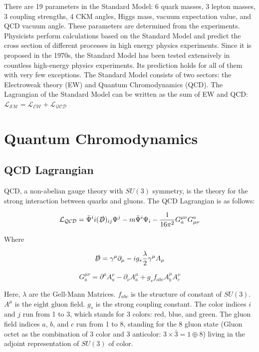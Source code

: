 There are 19 parameters in the Standard Model: 6 quark masses, 3 lepton masses, 3 coupling strengths, 4 CKM angles, Higgs mass, vacuum expectation value, and QCD vacuum angle. These parameters are determined from the experiments. Physicists perform calculations based on the Standard Model and predict the cross section of different processes in high energy physics experiments. Since it is proposed in the 1970s, the Standard Model has been tested extensively in countless high-energy physics experiments. Its prediction holds for all of them with very few exceptions. The Standard Model consists of two sectors: the Electroweak theory (EW) and Quantum Chromodynamics (QCD). The Lagrangian of the Standard Model can be written as the sum of EW and QCD: $\mathcal{L_{SM}} = \mathcal{L_{EW}} + \mathcal{L_{QCD}}$ 


\section{Quantum Chromodynamics}

\subsection{QCD Lagrangian}

QCD, a non-abelian gauge theory with $SU(3)$ symmetry, is the theory for the strong interaction between quarks and gluons. The QCD Lagrangian is as follows:


\begin{equation}
\mathcal{L_{QCD}} = \bar \Psi^i i (\slashed{D})_{ij} \Psi^j - m  \bar \Psi^i \Psi_i - \frac{1}{16\pi^2} G^{\mu\nu}_{a}G_{\mu\nu}^{a}
\end{equation}

Where 

\begin{equation}
\slashed{D} = \gamma^\mu \partial_\mu - i g_s \frac{\lambda}{2}  \gamma^\mu A_\mu
\end{equation}

\begin{equation}
G^{\mu\nu}_{a} = \partial^\mu A^\nu_{a} - \partial_{\nu} A^\mu_{a} + g_s f_{abc} A^\mu_b A^\nu_c 
\end{equation}

Here, $\lambda$ are the Gell-Mann Matrices. $f_{abc}$ is the structure of constant of $SU(3)$. $A^\mu$ is the eight gluon field. $g_s$ is the strong coupling constant. The color indices $i$ and $j$ run from 1 to 3, which stands for 3 colors: red, blue, and green. The gluon field indices $a$, $b$, and $c$ run from 1 to 8, standing for the 8 gluon state (Gluon octet as the combination of 3 color and 3 anticolor: $3 \times \bar 3 = 1 \oplus 8$) living in the adjoint representation of $SU(3)$ of color.  




